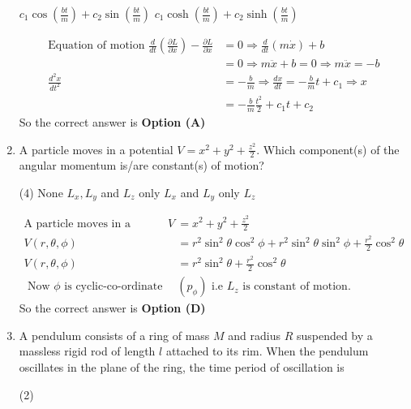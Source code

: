 \begin{enumerate}
\begin{tasks}
		\task[\textbf{C.}] $c_{1} \cos \left(\frac{b t}{m}\right)+c_{2} \sin \left(\frac{b t}{m}\right)$
		\task[\textbf{D.}] $c_{1} \cosh \left(\frac{b t}{m}\right)+c_{2} \sinh \left(\frac{b t}{m}\right)$
	\end{tasks}	
\begin{answer}
	\begin{align*}
	\text{Equation of motion }\frac{d}{d t}\left(\frac{\partial L}{\partial \dot{x}}\right)-\frac{\partial L}{\partial x}&=0 \Rightarrow \frac{d}{d t}(m \dot{x})+b\\&=0 \Rightarrow m \ddot{x}+b=0 \Rightarrow m \ddot{x}=-b\\
	\frac{d^{2} x}{d t^{2}}&=-\frac{b}{m} \Rightarrow \frac{d x}{d t}=-\frac{b}{m} t+c_{1} \Rightarrow x\\&=-\frac{b}{m} \frac{t^{2}}{2}+c_{1} t+c_{2}
	\end{align*}
	So the correct answer is \textbf{Option (A)}
\end{answer}
	\item A particle moves in a potential $V=x^{2}+y^{2}+\frac{z^{2}}{2} .$ Which component(s) of the angular momentum is/are constant(s) of motion?
	{}
	\begin{tasks}(4)
		\task[\textbf{A.}] None
		\task[\textbf{B.}] $L_{x}, L_{y}$ and $L_{z}$
		\task[\textbf{C.}]  only $L_{x}$ and $L_{y}$
		\task[\textbf{D.}] only $L_{z}$
	\end{tasks}
\begin{answer}
	\begin{align*}
	\text{A particle moves in a potential }V&=x^{2}+y^{2}+\frac{z^{2}}{2}\\
	V(r, \theta, \phi)&=r^{2} \sin ^{2} \theta \cos ^{2} \phi+r^{2} \sin ^{2} \theta \sin ^{2} \phi+\frac{r^{2}}{2} \cos ^{2} \theta\\
	V(r, \theta, \phi)&=r^{2} \sin ^{2} \theta+\frac{r^{2}}{2} \cos ^{2} \theta\\
	\text{	Now $\phi$ is cyclic-co-ordinate }&\left(p_{\phi}\right)\text{ i.e $L_{z}$ is constant of motion.}
	\end{align*}
	So the correct answer is \textbf{Option (D)}
\end{answer}
	\item A pendulum consists of a ring of mass $M$ and radius $R$ suspended by a massless rigid rod of length $l$ attached to its rim. When the pendulum oscillates in the plane of the ring, the time period of oscillation is
	{}
	\begin{tasks}(2)

\end{tasks}
\end{enumerate}
